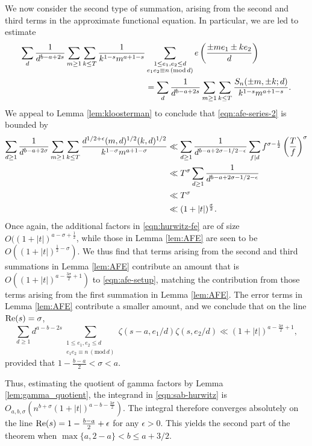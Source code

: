 \documentclass[12pt]{amsart}
\numberwithin{equation}{section}
\numberwithin{theorem}{section}
\renewcommand\Re{\textnormal{Re}}
\renewcommand{\pmod}[1]{\,\left(\mathrm{mod}\,#1\right)}
\begin{document}
We now consider the second type of summation, arising from the second and third terms in the approximate functional equation.  In particular, we are led to estimate
\begin{align}\label{eqn:afe-series-2}
\sum_d \frac{1}{d^{b-a+2s}}  \sum_{m \geq 1} \sum_{k \leq T} \frac{1}{k^{1-s} m^{a+1-s}} & \sum_{\substack{1 \leq e_1,e_2 \leq d \\ e_1e_2 \equiv n \pmod{d}}} e\left(\frac{\pm me_1\pm ke_2}{d}\right) \\
	\notag &=\sum_d \frac{1}{d^{b-a+2s}} \sum_{m \geq 1} \sum_{k \leq T} \frac{S_n(\pm m,\pm k;d)}{k^{1-s} m^{a+1-s}}.
\end{align}
We appeal to Lemma \ref{lem:kloosterman} to conclude that \eqref{eqn:afe-series-2} is bounded by
\begin{align}\label{eqn:afe-bound-2}
\sum_{d \geq 1} \frac{1}{d^{b-a+2\sigma}} \sum_{m \geq 1} \sum_{k \leq T} \frac{d^{1/2+\epsilon}(m,d)^{1/2}(k,d)^{1/2}}{k^{1-\sigma} m^{a+1-\sigma}}
	&\ll \sum_{d \geq 1} \frac{1}{d^{b-a+2\sigma-1/2-\epsilon}} \sum_{f \mid d} f^{\sigma-\frac{1}{2}} \left(\frac{T}{f}\right)^{\sigma} \\
	\notag & \ll T^\sigma \sum_{d \geq 1} \frac{1}{d^{b-a+2\sigma-1/2-\epsilon}} \\
	\notag & \ll T^\sigma \\
	\notag & \ll (1+|t|)^{\frac{\sigma}{2}}.
\end{align}
Once again, the additional factors in \eqref{eqn:hurwitz-fe} are of size $O((1+|t|)^{a-\sigma+\frac{1}{2}}$, while those in Lemma \ref{lem:AFE} are seen to be $O((1+|t|)^{\frac{1}{2}-\sigma})$.  We thus find that terms arising from the second and third summations in Lemma \ref{lem:AFE} contribute an amount that is $O((1+|t|)^{a-\frac{3\sigma}{2}+1})$ to \eqref{eqn:afe-setup}, matching the contribution from those terms arising from the first summation in Lemma \ref{lem:AFE}.  The error terms in Lemma \ref{lem:AFE} contribute a smaller amount, and we conclude that on the line $\Re(s)=\sigma$,
\begin{equation} \label{eqn:afe-conclusion}
	\sum_{d \geq 1} d^{a-b-2s} \sum_{\substack{ 1 \leq e_1,e_2 \leq d \\ e_1e_2 \equiv n\pmod{d}}} \zeta(s-a, e_1/d) \zeta(s, e_2/d)
		\ll (1+|t|)^{a - \frac{3\sigma}{2}+1},
\end{equation}
provided that $1 - \frac{b-a}{2} < \sigma < a$.

Thus, estimating the quotient of gamma factors by
Lemma \ref{lem:gamma_quotient},  the integrand in \eqref{eqn:sab-hurwitz} is $O_{a,b,\sigma}(n^{b+\sigma} (1+|t|)^{a-b-\frac{3\sigma}{2}})$.  The integral therefore converges absolutely on the line 
$\Re(s) = 1 - \frac{b-a}{2}+\epsilon$ for any $\epsilon>0$. This yields the second part of the theorem when
$\max\{a,2-a\} < b\leq  a + 3/2$.
\end{document}
